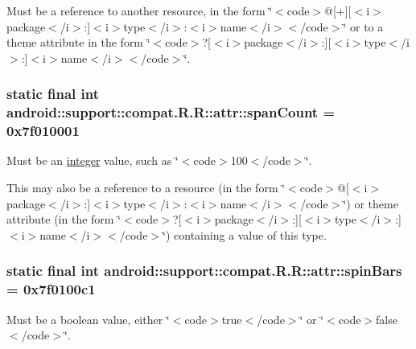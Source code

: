 Must be a reference to another resource, in the form \char`\"{}$<$code$>$@\mbox{[}+\mbox{]}\mbox{[}$<$i$>$package$<$/i$>$:\mbox{]}$<$i$>$type$<$/i$>$:$<$i$>$name$<$/i$>$$<$/code$>$\char`\"{} or to a theme attribute in the form \char`\"{}$<$code$>$?\mbox{[}$<$i$>$package$<$/i$>$:\mbox{]}\mbox{[}$<$i$>$type$<$/i$>$:\mbox{]}$<$i$>$name$<$/i$>$$<$/code$>$\char`\"{}. \hypertarget{classandroid_1_1support_1_1compat_1_1_r_1_1attr_2014787a67a5ec7071045f1f17b92bcd}{
\subsubsection[{spanCount}]{\setlength{\rightskip}{0pt plus 5cm}static final int android::support::compat.R.R::attr::spanCount = 0x7f010001}}
\label{classandroid_1_1support_1_1compat_1_1_r_1_1attr_2014787a67a5ec7071045f1f17b92bcd}


Must be an \hyperlink{classandroid_1_1support_1_1compat_1_1_r_1_1integer}{integer} value, such as \char`\"{}$<$code$>$100$<$/code$>$\char`\"{}. 

This may also be a reference to a resource (in the form \char`\"{}$<$code$>$@\mbox{[}$<$i$>$package$<$/i$>$:\mbox{]}$<$i$>$type$<$/i$>$:$<$i$>$name$<$/i$>$$<$/code$>$\char`\"{}) or theme attribute (in the form \char`\"{}$<$code$>$?\mbox{[}$<$i$>$package$<$/i$>$:\mbox{]}\mbox{[}$<$i$>$type$<$/i$>$:\mbox{]}$<$i$>$name$<$/i$>$$<$/code$>$\char`\"{}) containing a value of this type. \hypertarget{classandroid_1_1support_1_1compat_1_1_r_1_1attr_c60b4b2cbbb1edc55b7faf8b37e74ad9}{
\subsubsection[{spinBars}]{\setlength{\rightskip}{0pt plus 5cm}static final int android::support::compat.R.R::attr::spinBars = 0x7f0100c1}}
\label{classandroid_1_1support_1_1compat_1_1_r_1_1attr_c60b4b2cbbb1edc55b7faf8b37e74ad9}


Must be a boolean value, either \char`\"{}$<$code$>$true$<$/code$>$\char`\"{} or \char`\"{}$<$code$>$false$<$/code$>$\char`\"{}. 

